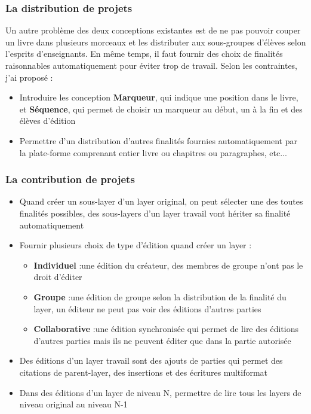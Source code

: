 \subsubsection{La distribution de projets}

Un autre problème des deux conceptions existantes est de ne pas pouvoir couper un livre dans plusieurs morceaux et les distributer aux sous-groupes d'élèves selon l'esprits d'enseignants. En même temps, il faut fournir des choix de finalités raisonnables automatiquement pour éviter trop de travail. Selon les contraintes, j'ai proposé :

\begin{itemize}
    \item Introduire les conception \textbf{Marqueur}, qui indique une position dans le livre, et \textbf{Séquence}, qui permet de choisir un marqueur au début, un à la fin et des élèves d'édition
    \item Permettre d'un distribution d'autres finalités fournies automatiquement par la plate-forme comprenant entier livre ou chapitres ou paragraphes, etc...
\end{itemize}

\subsubsection{La contribution de projets}

\begin{itemize}
    \item Quand créer un sous-layer d'un layer original, on peut sélecter une des toutes finalités possibles, des sous-layers d'un layer travail vont hériter sa finalité automatiquement
    \item Fournir plusieurs choix de type d'édition quand créer un layer :
            \begin{itemize}
                \item \textbf{Individuel} :une édition du créateur, des membres de groupe n'ont pas le droit d'éditer
                \item \textbf{Groupe} :une édition de groupe selon la distribution de la finalité du layer, un éditeur ne peut pas voir des éditions d'autres parties
                \item \textbf{Collaborative} :une édition synchronisée qui permet de lire des éditions d'autres parties mais ils ne peuvent éditer que dans la partie autorisée
            \end{itemize}
    \item Des éditions d'un layer travail sont des ajouts de parties qui permet des citations de parent-layer, des insertions et des écritures multiformat
    \item Dans des éditions d'un layer de niveau N, permettre de lire tous les layers de niveau original au niveau N-1
\end{itemize}

